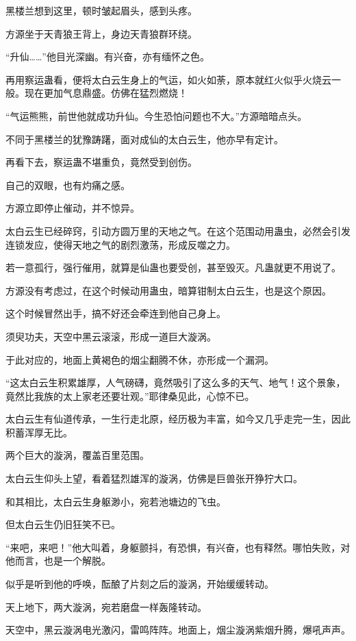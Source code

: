 \begin{this_body}
黑楼兰想到这里，顿时皱起眉头，感到头疼。

方源坐于天青狼王背上，身边天青狼群环绕。

“升仙……”他目光深幽。有兴奋，亦有缅怀之色。

再用察运蛊看，便将太白云生身上的气运，如火如荼，原本就红火似乎火烧云一般。现在更加气息鼎盛。仿佛在猛烈燃烧！

“气运熊熊，前世他就成功升仙。今生恐怕问题也不大。”方源暗暗点头。

不同于黑楼兰的犹豫踌躇，面对成仙的太白云生，他亦早有定计。

再看下去，察运蛊不堪重负，竟然受到创伤。

自己的双眼，也有灼痛之感。

方源立即停止催动，并不惊异。

太白云生已经碎窍，引动方圆万里的天地之气。在这个范围动用蛊虫，必然会引发连锁发应，使得天地之气的剧烈激荡，形成反噬之力。

若一意孤行，强行催用，就算是仙蛊也要受创，甚至毁灭。凡蛊就更不用说了。

方源没有考虑过，在这个时候动用蛊虫，暗算钳制太白云生，也是这个原因。

这个时候冒然出手，搞不好还会牵连到他自己身上。

须臾功夫，天空中黑云滚滚，形成一道巨大漩涡。

于此对应的，地面上黄褐色的烟尘翻腾不休，亦形成一个漏洞。

“这太白云生积累雄厚，人气磅礴，竟然吸引了这么多的天气、地气！这个景象，竟然比我族的太上家老还要壮观。”耶律桑见此，心惊不已。

太白云生有仙道传承，一生行走北原，经历极为丰富，如今又几乎走完一生，因此积蓄浑厚无比。

两个巨大的漩涡，覆盖百里范围。

太白云生仰头上望，看着猛烈雄浑的漩涡，仿佛是巨兽张开狰狞大口。

和其相比，太白云生身躯渺小，宛若池塘边的飞虫。

但太白云生仍旧狂笑不已。

“来吧，来吧！”他大叫着，身躯颤抖，有恐惧，有兴奋，也有释然。哪怕失败，对他而言，也是一个解脱。

似乎是听到他的呼唤，酝酿了片刻之后的漩涡，开始缓缓转动。

天上地下，两大漩涡，宛若磨盘一样轰隆转动。

天空中，黑云漩涡电光激闪，雷鸣阵阵。地面上，烟尘漩涡紫烟升腾，爆吼声声。


\end{this_body}
